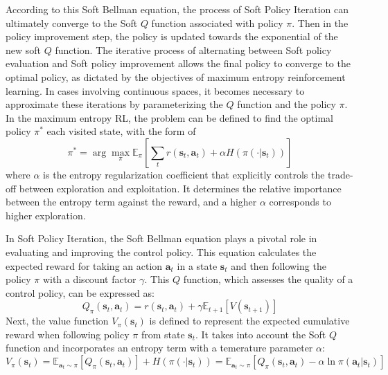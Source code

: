 According to this Soft Bellman equation\cite{haarnojaSoftActorCriticOffPolicy2018}, the process of Soft Policy Iteration can ultimately converge to the Soft $Q$ function associated with policy $\pi$. Then in the policy improvement step, the policy is updated towards the exponential of the new soft $Q$ function. The iterative process of alternating between Soft policy evaluation and Soft policy improvement allows the final policy to converge to the optimal policy, as dictated by the objectives of maximum entropy reinforcement learning. In cases involving continuous spaces, it becomes necessary to approximate these iterations by parameterizing the $Q$ function and the policy $\pi$. In the maximum entropy RL, the problem can be defined to find the optimal policy $\pi^*$ each visited state, with the form of 
\begin{equation}
    \pi^* = \arg\max_\pi\mathbb{E}_\pi [\sum_t r(\mathbf{s}_t,\mathbf{a}_t)+\alpha H(\pi(\cdot|\mathbf{s}_t))]
    \label{eq:bellman}
\end{equation} 
where $\alpha$ is the entropy regularization coefficient that explicitly controls the trade-off between exploration and exploitation. It determines the relative importance between the entropy term against the reward, and a higher $\alpha$ corresponds to higher exploration. 

In Soft Policy Iteration, the Soft Bellman equation plays a pivotal role in evaluating and improving the control policy. This equation calculates the expected reward for taking an action $\mathbf{a}_t$ in a state $\mathbf{s}_t$ and then following the policy $\pi$ with a discount factor $\gamma$.  This $Q$ function, which assesses the quality of a control policy, can be expressed as:
\begin{equation}
    Q_\pi(\mathbf{s}_t,\mathbf{a}_t) = r(\mathbf{s}_t,\mathbf{a}_t) + \gamma\mathbb{E}_{t+1}[V(\mathbf{s}_{t+1})]
    \label{eq:Q}
\end{equation} 
Next, the value function $V_\pi(\mathbf{s}_t)$ is defined to represent the expected cumulative reward when following policy $\pi$ from state $\mathbf{s}_t$. It takes into account the Soft $Q$ function and incorporates an entropy term with a temerature parameter $\alpha$:
\begin{equation}
    V_\pi(\mathbf{s}_t) = \mathbb{E}_{\mathbf{a}_t\sim \pi}[Q_\pi(\mathbf{s}_t,\mathbf{a}_t)] + H(\pi(\cdot|\mathbf{s}_t)) = \mathbb{E}_{\mathbf{a}_t\sim \pi}[Q_\pi(\mathbf{s}_t,\mathbf{a}_t) - \alpha\ln\pi(\mathbf{a}_t|\mathbf{s}_t)]
    \label{eq:valuef}
\end{equation}

